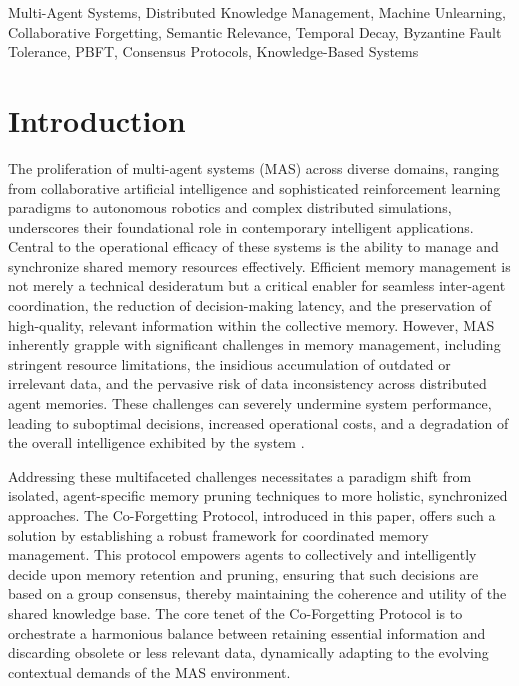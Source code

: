 \documentclass[conference]{IEEEtran}
\begin{document}
\begin{IEEEkeywords}
Multi-Agent Systems, Distributed Knowledge Management, Machine Unlearning, Collaborative Forgetting, Semantic Relevance, Temporal Decay, Byzantine Fault Tolerance, PBFT, Consensus Protocols, Knowledge-Based Systems
\end{IEEEkeywords}

\section{Introduction}
\label{sec:introduction}

The proliferation of multi-agent systems (MAS) across diverse domains, ranging from collaborative artificial intelligence and sophisticated reinforcement learning paradigms to autonomous robotics and complex distributed simulations, underscores their foundational role in contemporary intelligent applications. Central to the operational efficacy of these systems is the ability to manage and synchronize shared memory resources effectively. Efficient memory management is not merely a technical desideratum but a critical enabler for seamless inter-agent coordination, the reduction of decision-making latency, and the preservation of high-quality, relevant information within the collective memory. However, MAS inherently grapple with significant challenges in memory management, including stringent resource limitations, the insidious accumulation of outdated or irrelevant data, and the pervasive risk of data inconsistency across distributed agent memories. These challenges can severely undermine system performance, leading to suboptimal decisions, increased operational costs, and a degradation of the overall intelligence exhibited by the system \cite{Wooldridge2009}.

Addressing these multifaceted challenges necessitates a paradigm shift from isolated, agent-specific memory pruning techniques to more holistic, synchronized approaches. The Co-Forgetting Protocol, introduced in this paper, offers such a solution by establishing a robust framework for coordinated memory management. This protocol empowers agents to collectively and intelligently decide upon memory retention and pruning, ensuring that such decisions are based on a group consensus, thereby maintaining the coherence and utility of the shared knowledge base.
The core tenet of the Co-Forgetting Protocol is to orchestrate a harmonious balance between retaining essential information and discarding obsolete or less relevant data, dynamically adapting to the evolving contextual demands of the MAS environment.
\end{document}

